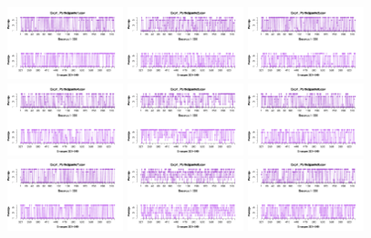 \begin{figure}[th]
\centering
\includegraphics[width=0.30\textwidth]{Figures/Rating_Exp1_P1} \includegraphics[width=0.30\textwidth]{Figures/Rating_Exp1_P2} \includegraphics[width=0.30\textwidth]{Figures/Rating_Exp1_P3}
\includegraphics[width=0.30\textwidth]{Figures/Rating_Exp1_P4} \includegraphics[width=0.30\textwidth]{Figures/Rating_Exp1_P5} \includegraphics[width=0.30\textwidth]{Figures/Rating_Exp1_P6}
\includegraphics[width=0.30\textwidth]{Figures/Rating_Exp1_P7} \includegraphics[width=0.30\textwidth]{Figures/Rating_Exp1_P8} \includegraphics[width=0.30\textwidth]{Figures/Rating_Exp1_P9}

\end{figure}
